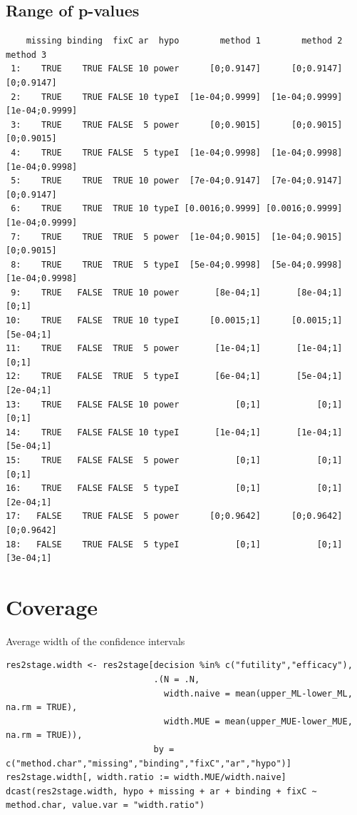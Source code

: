 \documentclass[12pt]{article}
\begin{document}
\subsection{Range of p-values}
\label{sec:org8d81157}

\begin{verbatim}
    missing binding  fixC ar  hypo        method 1        method 2       method 3
 1:    TRUE    TRUE FALSE 10 power      [0;0.9147]      [0;0.9147]     [0;0.9147]
 2:    TRUE    TRUE FALSE 10 typeI  [1e-04;0.9999]  [1e-04;0.9999] [1e-04;0.9999]
 3:    TRUE    TRUE FALSE  5 power      [0;0.9015]      [0;0.9015]     [0;0.9015]
 4:    TRUE    TRUE FALSE  5 typeI  [1e-04;0.9998]  [1e-04;0.9998] [1e-04;0.9998]
 5:    TRUE    TRUE  TRUE 10 power  [7e-04;0.9147]  [7e-04;0.9147]     [0;0.9147]
 6:    TRUE    TRUE  TRUE 10 typeI [0.0016;0.9999] [0.0016;0.9999] [1e-04;0.9999]
 7:    TRUE    TRUE  TRUE  5 power  [1e-04;0.9015]  [1e-04;0.9015]     [0;0.9015]
 8:    TRUE    TRUE  TRUE  5 typeI  [5e-04;0.9998]  [5e-04;0.9998] [1e-04;0.9998]
 9:    TRUE   FALSE  TRUE 10 power       [8e-04;1]       [8e-04;1]          [0;1]
10:    TRUE   FALSE  TRUE 10 typeI      [0.0015;1]      [0.0015;1]      [5e-04;1]
11:    TRUE   FALSE  TRUE  5 power       [1e-04;1]       [1e-04;1]          [0;1]
12:    TRUE   FALSE  TRUE  5 typeI       [6e-04;1]       [5e-04;1]      [2e-04;1]
13:    TRUE   FALSE FALSE 10 power           [0;1]           [0;1]          [0;1]
14:    TRUE   FALSE FALSE 10 typeI       [1e-04;1]       [1e-04;1]      [5e-04;1]
15:    TRUE   FALSE FALSE  5 power           [0;1]           [0;1]          [0;1]
16:    TRUE   FALSE FALSE  5 typeI           [0;1]           [0;1]      [2e-04;1]
17:   FALSE    TRUE FALSE  5 power      [0;0.9642]      [0;0.9642]     [0;0.9642]
18:   FALSE    TRUE FALSE  5 typeI           [0;1]           [0;1]      [3e-04;1]
\end{verbatim}

\section{Coverage}
\label{sec:org7ec3dc9}

Average width of the confidence intervals
\lstset{language=r,label= ,caption= ,captionpos=b,numbers=none}
\begin{lstlisting}
res2stage.width <- res2stage[decision %in% c("futility","efficacy"),
                             .(N = .N,
                               width.naive = mean(upper_ML-lower_ML, na.rm = TRUE),
                               width.MUE = mean(upper_MUE-lower_MUE, na.rm = TRUE)),
                             by = c("method.char","missing","binding","fixC","ar","hypo")]
res2stage.width[, width.ratio := width.MUE/width.naive]
dcast(res2stage.width, hypo + missing + ar + binding + fixC ~ method.char, value.var = "width.ratio")
\end{lstlisting}
\end{document}
